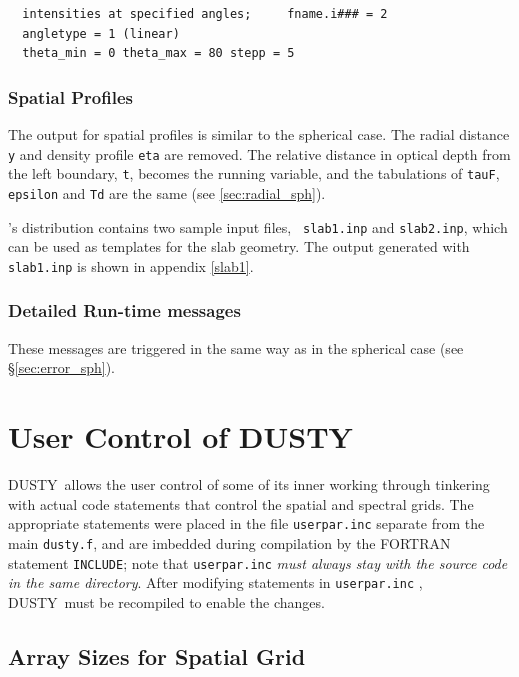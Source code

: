 \documentclass[11pt]{article}
\def\D    {{\sf DUSTY}}
\begin{document}
\begin{verbatim}
  intensities at specified angles;     fname.i### = 2
  angletype = 1 (linear)
  theta_min = 0 theta_max = 80 stepp = 5
\end{verbatim}


\subsubsection{Spatial Profiles}
\label{sec:spatial_slb}

The output for spatial profiles is similar to the spherical case. The radial
distance {\tt y} and density profile {\tt eta} are removed. The relative
distance in optical depth from the left boundary, {\tt t}, becomes the running
variable, and the tabulations of {\tt tauF}, {\tt epsilon} and {\tt Td} are
the same (see \ref{sec:radial_sph}).

\bigskip \D's distribution contains two sample input files, {\tt
  slab1.inp} and {\tt slab2.inp}, which can be used as templates for
the slab geometry.  The output generated with {\tt slab1.inp} is shown
in appendix \ref{slab1}.


\subsubsection{Detailed Run-time messages}
\label{sec:error_slb}

These messages are triggered in the same way as in the spherical case (see
\S\ref{sec:error_sph}).


\section{User Control of \D}
\label{sec:user_control}

\D\ allows the user control of some of its inner working through tinkering
with actual code statements that control the spatial and spectral grids. The
appropriate statements were placed in the file {\tt userpar.inc} separate from
the main {\tt dusty.f}, and are imbedded during compilation by the FORTRAN
statement {\tt INCLUDE}; note that {\tt userpar.inc} \emph{must always stay
with the source code in the same directory}. After modifying statements in
{\tt userpar.inc} , \D\ must be recompiled to enable the changes.

\subsection{Array Sizes for Spatial Grid}
\label{Memory}
\end{document}
